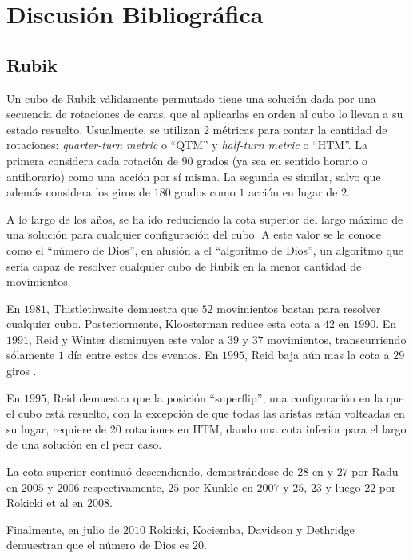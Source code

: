 \chapter{Discusión Bibliográfica}

\section*{Rubik}
Un cubo de Rubik válidamente permutado tiene una solución dada por una secuencia de rotaciones de caras, que al aplicarlas en orden al cubo lo llevan a su estado resuelto. Usualmente, se utilizan 2 métricas para contar la cantidad de rotaciones: \emph{quarter-turn metric} o ``QTM''\cite{qtm} y \emph{half-turn metric} o ``HTM''\cite{htm}. La primera considera cada rotación de $90$ grados (ya sea en sentido horario o antihorario) como una acción por sí misma. La segunda es similar, salvo que además considera los giros de $180$ grados como $1$ acción en lugar de $2$.

A lo largo de los años, se ha ido reduciendo la cota superior del largo máximo de una solución para cualquier configuración del cubo. A este valor se le conoce como el ``número de Dios'', en alusión a el ``algoritmo de Dios'', un algoritmo que sería capaz de resolver cualquier cubo de Rubik en la menor cantidad de movimientos\cite{godalgorithm}.

En $1981$, Thistlethwaite\cite{thistlethwaite} demuestra que $52$ movimientos bastan para resolver cualquier cubo. Posteriormente, Kloosterman\cite{kloosterman} reduce esta cota a $42$ en $1990$. En $1991$, Reid y Winter disminuyen este valor a $39$ y $37$ movimientos, transcurriendo sólamente $1$ día entre estos dos eventos\cite{reid39}\cite{winter}. En $1995$, Reid baja aún mas la cota a $29$ giros \cite{reid29}.

En $1995$, Reid demuestra que la posición ``superflip'', una configuración en la que el cubo está resuelto, con la excepción de que todas las aristas están volteadas en su lugar, requiere de 20 rotaciones\cite{superflip} en HTM, dando una cota inferior para el largo de una solución en el peor caso.

La cota superior continuó descendiendo, demostrándose de $28$ en y $27$ por Radu\cite{radu28}\cite{radu27} en $2005$ y $2006$ respectivamente, $25$ por Kunkle\cite{kunkle} en $2007$ y $25$, $23$ y luego $22$ por Rokicki\cite{rokicki25}\cite{rokicki23}\cite{rokicki22} et al en $2008$.

Finalmente, en julio de $2010$ Rokicki, Kociemba, Davidson y Dethridge demuestran que el número de Dios es $20$\cite{godnumber20}.

